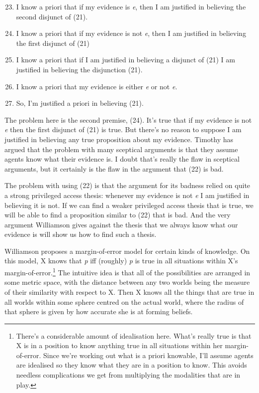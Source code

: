 \begin{enumerate}
\setcounter{enumi}{22}
\item
  I know a priori that if my evidence is \emph{e}, then I am justified
  in believing the second disjunct of (21).
\item
  I know a priori that if my evidence is not \emph{e}, then I am
  justified in believing the first disjunct of (21)
\item
  I know a priori that if I am justified in believing a disjunct of (21)
  I am justified in believing the disjunction (21).
\item
  I know a priori that my evidence is either \emph{e} or not \emph{e}.
\item
  So, I'm justified a priori in believing (21).
\end{enumerate}

The problem here is the second premise, (24). It's true that if my
evidence is not \emph{e} then the first disjunct of (21) is true. But
there's no reason to suppose I am justified in believing any true
proposition about my evidence. Timothy
\cite[ch. 8]{Williamson2000-WILKAI} has argued that the problem with
many sceptical arguments is that they assume agents know what their
evidence is. I doubt that's really the flaw in sceptical arguments, but
it certainly is the flaw in the argument that (22) is bad.

The problem with using (22) is that the argument for its badness relied
on quite a strong privileged access thesis: whenever my evidence is not
\emph{e} I am justified in believing it is not. If we can find a weaker
privileged access thesis that is true, we will be able to find a
proposition similar to (22) that is bad. And the very argument
Williamson gives against the thesis that we always know what our
evidence is will show us how to find such a thesis.{ }

Williamson proposes a margin-of-error model for certain kinds of
knowledge. On this model, X knows that \emph{p} iff (roughly) \emph{p}
is true in all situations within X's margin-of-error.\footnote{There's a
  considerable amount of idealisation here. What's really true is that X
  is in a position to know anything true in all situations within her
  margin-of-error. Since we're working out what is a priori knowable,
  I'll assume agents are idealised so they know what they are in a
  position to know. This avoids needless complications we get from
  multiplying the modalities that are in play.} The intuitive idea is
that all of the possibilities are arranged in some metric space, with
the distance between any two worlds being the measure of their
similarity with respect to X. Then X knows all the things that are true
in all worlds within some sphere centred on the actual world, where the
radius of that sphere is given by how accurate she is at forming
beliefs.

